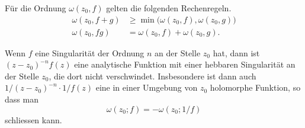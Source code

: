 Für die Ordnung $\omega(z_0,f)$ gelten die folgenden Rechenregeln.
\begin{align*}
\omega(z_0,f+g) &\ge \min\bigl(\omega(z_0,f),  \omega(z_0,g)\bigr)
\\
\omega(z_0,fg) &= \omega(z_0,f) + \omega(z_0,g).
\end{align*}

Wenn $f$ eine Singularität der Ordnung $n$ an der Stelle $z_0$ hat, 
dann ist $(z-z_0)^{-n}f(z)$ eine analytische Funktion mit einer
hebbaren Singularität an der Stelle $z_0$, die dort nicht verschwindet.
Insbesondere ist dann auch $1/(z-z_0)^{-n}\cdot 1/f(z)$ eine in einer
Umgebung von $z_0$ holomorphe Funktion, so dass man
\[
\omega(z_0;f)
=
-\omega(z_0;1/f)
\]
schliessen kann.

